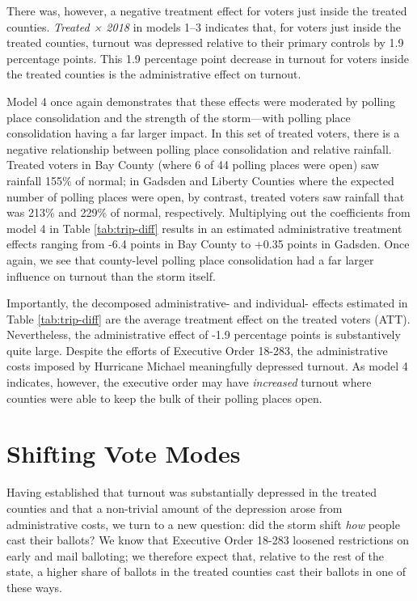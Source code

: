 \documentclass[
  12pt,
]{article}
\begin{document}
There was, however, a negative treatment effect for voters just inside the treated counties. \emph{Treated × 2018} in models 1--3 indicates that, for voters just inside the treated counties, turnout was depressed relative to their primary controls by 1.9 percentage points. This 1.9 percentage point decrease in turnout for voters inside the treated counties is the administrative effect on turnout.

Model 4 once again demonstrates that these effects were moderated by polling place consolidation and the strength of the storm---with polling place consolidation having a far larger impact. In this set of treated voters, there is a negative relationship between polling place consolidation and relative rainfall. Treated voters in Bay County (where 6 of 44 polling places were open) saw rainfall 155\% of normal; in Gadsden and Liberty Counties where the expected number of polling places were open, by contrast, treated voters saw rainfall that was 213\% and 229\% of normal, respectively. Multiplying out the coefficients from model 4 in Table \ref{tab:trip-diff} results in an estimated administrative treatment effects ranging from -6.4 points in Bay County to +0.35 points in Gadsden. Once again, we see that county-level polling place consolidation had a far larger influence on turnout than the storm itself.

Importantly, the decomposed administrative- and individual- effects estimated in Table \ref{tab:trip-diff} are the average treatment effect on the treated voters (ATT). Nevertheless, the administrative effect of -1.9 percentage points is substantively quite large. Despite the efforts of Executive Order 18-283, the administrative costs imposed by Hurricane Michael meaningfully depressed turnout. As model 4 indicates, however, the executive order may have \emph{increased} turnout where counties were able to keep the bulk of their polling places open.

\hypertarget{shifting-vote-modes}{%
\section*{Shifting Vote Modes}\label{shifting-vote-modes}}

Having established that turnout was substantially depressed in the treated counties and that a non-trivial amount of the depression arose from administrative costs, we turn to a new question: did the storm shift \emph{how} people cast their ballots? We know that Executive Order 18-283 loosened restrictions on early and mail balloting; we therefore expect that, relative to the rest of the state, a higher share of ballots in the treated counties cast their ballots in one of these ways.
\end{document}
